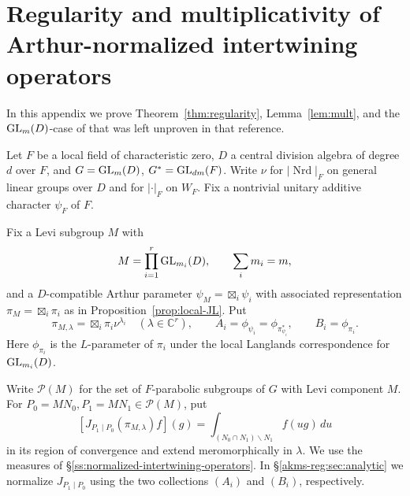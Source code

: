 \documentclass[11pt,reqno]{amsart}
\theoremstyle{plain}
\theoremstyle{definition}
\newcommand{\C}{\mathbb{C}}
\newcommand{\GL}{\tu{GL}}
\newcommand{\tu}{\textup}
\numberwithin{equation}{subsection}
\begin{document}
\appendix
\section{Regularity and multiplicativity of Arthur-normalized intertwining operators}
\label{akms-reg:appendix}
In this appendix we prove Theorem~\ref{thm:regularity},  Lemma~\ref{lem:mult}, and the $\GL_m(D)$-case of \cite[Lem.~2.2.4]{KMSW} that was left unproven in that reference. 

Let $F$ be a local field of characteristic zero, $D$ a central
division algebra of degree $d$ over $F$, and
$G=\GL_m(D)$, $G^*=\GL_{dm}(F)$.
Write $\nu$ for $|\operatorname{Nrd}|_F$ on general linear groups
over $D$ and for $|\cdot|_F$ on $W_F$.
Fix a nontrivial unitary additive character $\psi_F$ of $F$.

Fix a Levi subgroup $M$ with
\[
 M=\prod_{i=1}^r\GL_{m_i}(D),\qquad \sum_i m_i=m,
\]
and a $D$-compatible Arthur parameter
$\psi_M=\boxtimes_i\psi_i$ with associated representation
$\pi_M=\boxtimes_i\pi_i$ as in Proposition~\ref{prop:local-JL}.
Put
\[
 \pi_{M,\lambda}=\boxtimes_i\pi_i\nu^{\lambda_i}
 \quad(\lambda\in\C^r),\qquad
 A_i=\phi_{\psi_i}=\phi_{\pi_{\psi_i}^*},\qquad
 B_i=\phi_{\pi_i}.
\]
Here $\phi_{\pi_i}$ is the $L$-parameter of $\pi_i$ under the local
Langlands correspondence for $\GL_{m_i}(D)$.

Write $\mathcal P(M)$ for the set of $F$-parabolic subgroups of $G$ with Levi component $M$. For $P_0=MN_0,P_1=MN_1\in\mathcal P(M)$, put
\[
 [J_{P_1\mid P_0}(\pi_{M,\lambda})f](g)
 =\int_{(N_0\cap N_1)\backslash N_1} f(ug)\,du
\]
in its region of convergence and extend meromorphically in $\lambda$.
We use the measures of \S\ref{ss:normalized-intertwining-operators}.
In \S\ref{akms-reg:sec:analytic} we normalize $J_{P_1\mid P_0}$
using the two collections $(A_i)$ and $(B_i)$, respectively.
 
\end{document}
